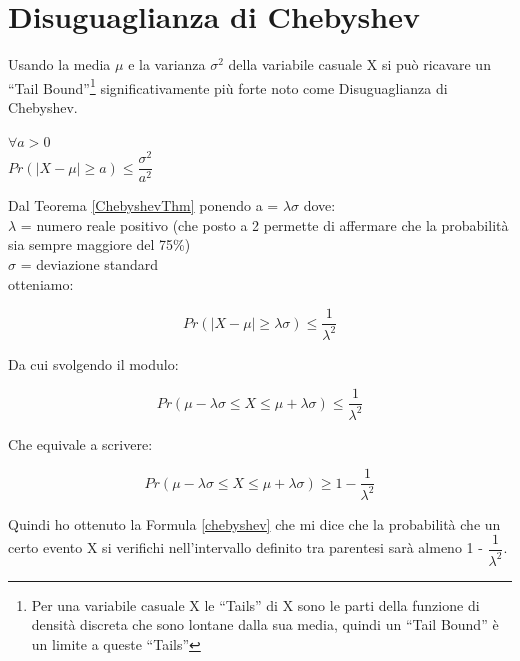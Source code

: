 \section{Disuguaglianza di Chebyshev}\label{disuguaglianzaChebyshev}
Usando la media $\mu$ e la varianza $\sigma^{2}$ della variabile casuale X si pu\`o ricavare un ``Tail Bound''\footnote{Per una variabile casuale X le ``Tails'' di X sono le parti della funzione di densit\`a discreta che sono lontane dalla sua media, quindi un ``Tail Bound'' \`e un limite a queste ``Tails''} significativamente pi\`u forte noto come Disuguaglianza di Chebyshev.

\begin{theorem}
\label{ChebyshevThm}
    $\forall a > 0$\\
    $Pr(\mid X - \mu \mid \ge a) \le \dfrac{\sigma^{2}}{a^{2}}$ 
\end{theorem}

Dal Teorema \ref{ChebyshevThm} ponendo a = $\lambda\sigma$ dove:\\
$\lambda$ = numero reale positivo (che posto a 2 permette di affermare che la probabilit\`a sia sempre maggiore del 75\%)\\
$\sigma$ = deviazione standard\\
otteniamo:

\begin{equation}
    Pr(\mid X - \mu \mid \ge \lambda\sigma) \le \dfrac{1}{\lambda^{2}}
\end{equation}

Da cui svolgendo il modulo:

\begin{equation}
    Pr(\mu - \lambda\sigma \le X \le \mu + \lambda\sigma) \le \dfrac{1}{\lambda^{2}}
\end{equation}

Che equivale a scrivere:

\begin{equation}\label{chebyshev}
    Pr(\mu - \lambda\sigma \le X \le \mu + \lambda\sigma) \ge 1 - \dfrac{1}{\lambda^{2}}
\end{equation}

Quindi ho ottenuto la Formula \ref{chebyshev} che mi dice che la probabilit\`a che un certo evento X si verifichi nell'intervallo definito tra parentesi sar\`a almeno 1 - $\dfrac{1}{\lambda^{2}}$. \cite{probAndComputing}
